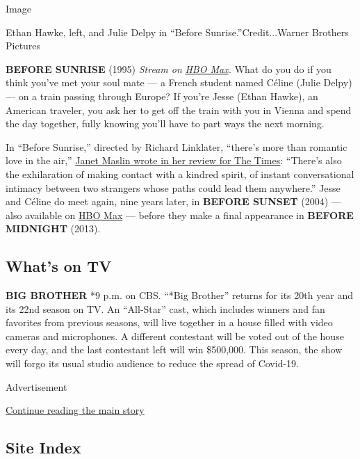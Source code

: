 Image

Ethan Hawke, left, and Julie Delpy in ``Before Sunrise.''Credit...Warner
Brothers Pictures

\textbf{BEFORE SUNRISE} (1995) \emph{Stream on}
\href{https://www.hbo.com/movies/before-sunrise}{\emph{HBO Max}}\emph{.}
What do you do if you think you've met your soul mate --- a French
student named Céline (Julie Delpy) --- on a train passing through
Europe? If you're Jesse (Ethan Hawke), an American traveler, you ask her
to get off the train with you in Vienna and spend the day together,
fully knowing you'll have to part ways the next morning.

In ``Before Sunrise,'' directed by Richard Linklater, ``there's more
than romantic love in the air,''
\href{https://www.nytimes.com/1995/01/27/movies/film-review-strangers-on-a-train-and-soul-mates-for-a-night.html}{Janet
Maslin wrote in her review for The Times}: ``There's also the
exhilaration of making contact with a kindred spirit, of instant
conversational intimacy between two strangers whose paths could lead
them anywhere.'' Jesse and Céline do meet again, nine years later, in
\textbf{BEFORE SUNSET} (2004) --- also available on
\href{https://www.hbo.com/movies/before-sunset}{HBO Max} --- before they
make a final appearance in \textbf{BEFORE MIDNIGHT} (2013).

\hypertarget{whats-on-tv}{%
\subsection{What's on TV}\label{whats-on-tv}}

\textbf{BIG BROTHER} *9 p.m. on CBS. ``*Big Brother'' returns for its
20th year and its 22nd season on TV. An ``All-Star'' cast, which
includes winners and fan favorites from previous seasons, will live
together in a house filled with video cameras and microphones. A
different contestant will be voted out of the house every day, and the
last contestant left will win \$500,000. This season, the show will
forgo its usual studio audience to reduce the spread of Covid-19.

Advertisement

\protect\hyperlink{after-bottom}{Continue reading the main story}

\hypertarget{site-index}{%
\subsection{Site Index}\label{site-index}}


